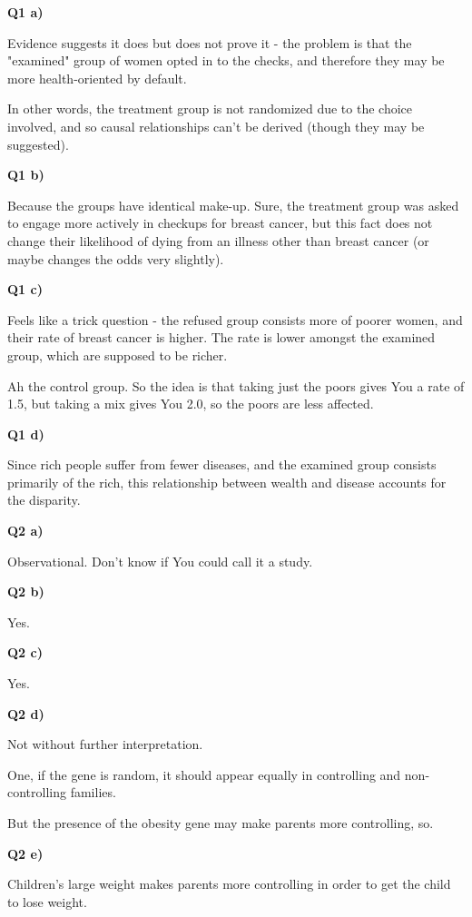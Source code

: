 \documentclass{article}
\begin{document}
		\textbf{Q1 a)}
		
			Evidence suggests it does but does not prove it - the problem is that the "examined" group of women opted in to the checks, and therefore they may be more health-oriented by default. 
			
			In other words, the treatment group is not randomized due to the choice involved, and so causal relationships can't be derived (though they may be suggested).
			
		\textbf{Q1 b)}
		
			Because the groups have identical make-up. Sure, the treatment group was asked to engage more actively in checkups for breast cancer, but this fact does not change their likelihood of dying from an illness other than breast cancer (or maybe changes the odds very slightly).
			
		\textbf{Q1 c)}
		
			Feels like a trick question - the refused group consists more of poorer women, and their rate of breast cancer is higher. The rate is lower amongst the examined group, which are supposed to be richer.
			
			Ah the control group. So the idea is that taking just the poors gives You a rate of 1.5, but taking a mix gives You 2.0, so the poors are less affected.
			
		\textbf{Q1 d)}
		
			Since rich people suffer from fewer diseases, and the examined group consists primarily of the rich, this relationship between wealth and disease accounts for the disparity.
			
		\textbf{Q2 a)}
		
			Observational. Don't know if You could call it a study.
			
		\textbf{Q2 b)}
		
			Yes.
			
		\textbf{Q2 c)}
		
			Yes.
			
		\textbf{Q2 d)}
		
			Not without further interpretation. 
			
			One, if the gene is random, it should appear equally in controlling and non-controlling families.
			
			But the presence of the obesity gene may make parents more controlling, so.
			
		\textbf{Q2 e)}
		
			Children's large weight makes parents more controlling in order to get the child to lose weight.
			
\end{document}
